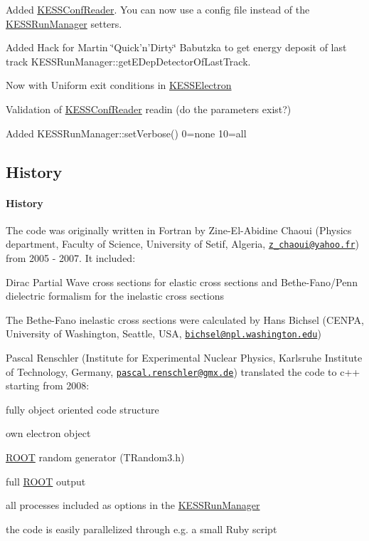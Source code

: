 \begin{DoxyItemize}
\item Added \hyperlink{class_kassiopeia_1_1_k_e_s_s_conf_reader}{KESSConfReader}. You can now use a config file instead of the \hyperlink{class_kassiopeia_1_1_k_e_s_s_run_manager}{KESSRunManager} setters.
\item Added Hack for Martin \char`\"{}Quick'n'Dirty\char`\"{} Babutzka to get energy deposit of last track KESSRunManager::getEDepDetectorOfLastTrack.
\item Now with Uniform exit conditions in \hyperlink{class_kassiopeia_1_1_k_e_s_s_electron}{KESSElectron}
\item Validation of \hyperlink{class_kassiopeia_1_1_k_e_s_s_conf_reader}{KESSConfReader} readin (do the parameters exist?)
\item Added KESSRunManager::setVerbose() 0=none 10=all 
\end{DoxyItemize}\hypertarget{KESSHistory}{}\subsection{History}\label{KESSHistory}
\hypertarget{_k_e_s_s_history_history}{}\paragraph{History}\label{_k_e_s_s_history_history}
The code was originally written in Fortran by Zine-\/El-\/Abidine Chaoui (Physics department, Faculty of Science, University of Setif, Algeria, \href{mailto:z_chaoui@yahoo.fr}{\tt z\_\-chaoui@yahoo.fr}) from 2005 -\/ 2007. It included:
\begin{DoxyItemize}
\item Dirac Partial Wave cross sections for elastic cross sections and Bethe-\/Fano/Penn dielectric formalism for the inelastic cross sections
\item The Bethe-\/Fano inelastic cross sections were calculated by Hans Bichsel (CENPA, University of Washington, Seattle, USA, \href{mailto:bichsel@npl.washington.edu}{\tt bichsel@npl.washington.edu})
\end{DoxyItemize}

Pascal Renschler (Institute for Experimental Nuclear Physics, Karlsruhe Institute of Technology, Germany, \href{mailto:pascal.renschler@gmx.de}{\tt pascal.renschler@gmx.de}) translated the code to c++ starting from 2008:
\begin{DoxyItemize}
\item fully object oriented code structure
\item own electron object
\item \hyperlink{namespace_kassiopeia_1_1_r_o_o_t}{ROOT} random generator (TRandom3.h)
\item full \hyperlink{namespace_kassiopeia_1_1_r_o_o_t}{ROOT} output
\item all processes included as options in the \hyperlink{class_kassiopeia_1_1_k_e_s_s_run_manager}{KESSRunManager}
\item the code is easily parallelized through e.g. a small Ruby script
\end{DoxyItemize}

